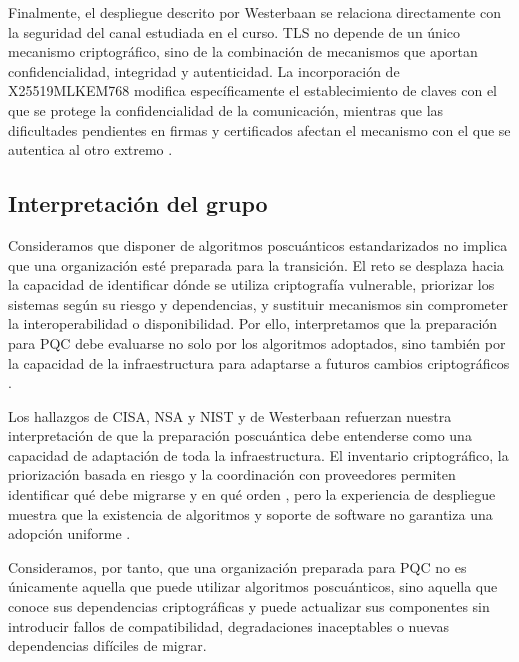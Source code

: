 Finalmente, el despliegue descrito por Westerbaan se relaciona directamente con la seguridad del canal estudiada en el curso. TLS no depende de un único mecanismo criptográfico, sino de la combinación de mecanismos que aportan confidencialidad, integridad y autenticidad. La incorporación de X25519MLKEM768 modifica específicamente el establecimiento de claves con el
que se protege la confidencialidad de la comunicación, mientras que las dificultades pendientes en firmas y certificados afectan el mecanismo con el que se autentica al otro extremo \cite{westerbaan2025postquantum}. 

\subsection{Interpretación del grupo}

Consideramos que disponer de algoritmos poscuánticos estandarizados no
implica que una organización esté preparada para la transición. El reto
se desplaza hacia la capacidad de identificar dónde se utiliza
criptografía vulnerable, priorizar los sistemas según su riesgo y
dependencias, y sustituir mecanismos sin comprometer la interoperabilidad
o disponibilidad. Por ello, interpretamos que la preparación para PQC
debe evaluarse no solo por los algoritmos adoptados, sino también por la
capacidad de la infraestructura para adaptarse a futuros cambios
criptográficos \cite{joseph2022transitioning,naether2024migrating,  
nist2024fips203,nist2024fips204,nist2024fips205}.

Los hallazgos de CISA, NSA y NIST y de Westerbaan refuerzan nuestra interpretación de que la preparación poscuántica debe entenderse como una capacidad de adaptación de toda la infraestructura. El inventario criptográfico, la priorización basada en riesgo y la coordinación con proveedores permiten identificar qué debe migrarse y en qué orden \cite{cisa2023quantum}, pero la experiencia de despliegue muestra que la existencia de algoritmos y soporte de software no garantiza una adopción uniforme \cite{westerbaan2025postquantum}.

Consideramos, por tanto, que una organización preparada para PQC no es únicamente aquella que
puede utilizar algoritmos poscuánticos, sino aquella que conoce sus dependencias criptográficas y puede actualizar sus componentes sin introducir fallos de compatibilidad, degradaciones inaceptables o nuevas dependencias difíciles de
migrar.
